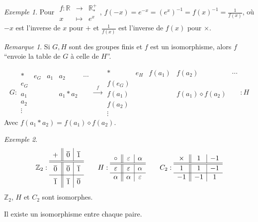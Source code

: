 \documentclass{report}
\newcommand*{\reels}{\mathbb{R}}
\newcommand*{\entiers}{\mathbb{Z}}
\theoremstyle{definition}
\theoremstyle{remark}
\newtheorem*{exem}{Exemple}
\newtheorem*{rema}{Remarque}
\begin{document}
	\begin{exem}
		Pour $\begin{array}{rcl}
			f:\reels&\to&\reels^+_*\\
			x&\mapsto&e^x
		\end{array}$, $f(-x)=e^{-x}=(e^x)^{-1}=f(x)^{-1}=\frac{1}{f(x)}$, o\`u $-x$ est l'inverse de $x$ pour $+$ et $\frac{1}{f(x)}$ est l'inverse de $f(x)$ pour $\times$.
	\end{exem}
	\begin{rema}
		Si $G,H$ sont des groupes finis et $f$ est un isomorphisme, alors $f$ ``envoie la table de $G$ \`a celle de $H$''.

		\[
		G:
		\begin{array}{c||c|c|c|c}
			*&e_G&a_1&a_2&\dotsb\\
			\hline\hline
			e_G&&&&\\
			\hline
			a_1&&&a_1*a_2&\\
			\hline
			a_2&&&&\\
			\hline
			\vdots&&&&
		\end{array}
		\xrightarrow{~~~f~~~}
		\begin{array}{c||c|c|c|c}
			*&e_H&f(a_1)&f(a_2)&\dotsb\\
			\hline\hline
			f(e_G)&&&&\\
			\hline
			f(a_1)&&&f(a_1) \diamond f(a_2)&\\
			\hline
			f(a_2)&&&&\\
			\hline
			\vdots&&&&
		\end{array}
		:H
		\]
		Avec $f(a_1*a_2)=f(a_1) \diamond f(a_2)$.
		\begin{exem}
			\[
			\entiers_2:
			\renewcommand{\arraystretch}{1.5}
			\begin{array}{c||c|c}
				+&\overline0&\overline1\\
				\hline\hline
				\overline0&\overline0&\overline1\\
				\hline
				\overline1&\overline1&\overline0
			\end{array}
			\renewcommand{\arraystretch}{1}
			\qquad
			H:
			\begin{array}{c||c|c}
				\circ&\varepsilon&\alpha\\
				\hline\hline
				\varepsilon&\varepsilon&\alpha\\
				\hline
				\alpha&\alpha&\varepsilon
			\end{array}
			\qquad
			C_2:
			\begin{array}{c||c|c}
				\times&1&-1\\
				\hline\hline
				1&1&-1\\
				\hline
				-1&-1&1
			\end{array}
			\]
			$\entiers_2$, $H$ et $C_2$ sont isomorphes.

			Il existe un isomorphisme entre chaque paire.
		\end{exem}
	\end{rema}
\end{document}
